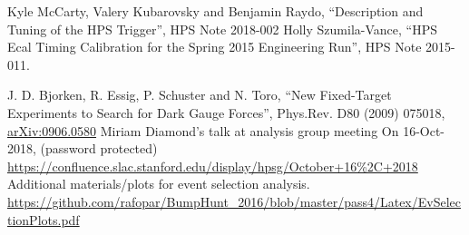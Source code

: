 \documentclass[letterpaper,12pt]{article}
\begin{document}
\clearpage
\begin{thebibliography}{55}
  Kyle McCarty, Valery Kubarovsky and Benjamin Raydo, ``Description and Tuning of the HPS Trigger'', HPS Note 2018-002
  Holly Szumila-Vance, ``HPS Ecal Timing Calibration for the
Spring 2015 Engineering Run'', HPS Note 2015-011.

 J. D. Bjorken, R. Essig, P. Schuster and N. Toro,
``New Fixed-Target Experiments to Search for Dark Gauge Forces'', Phys.Rev. D80 (2009) 075018, \href{https://arxiv.org/abs/0906.0580}{arXiv:0906.0580}
 Miriam Diamond's talk at analysis group meeting On 16-Oct-2018, (password protected) \href{https://confluence.slac.stanford.edu/display/hpsg/October+16%2C+2018}{https://confluence.slac.stanford.edu/display/hpsg/October+16\%2C+2018}
 Additional materials/plots for event selection analysis.\\
\href{https://github.com/rafopar/BumpHunt_2016/blob/master/pass4/Latex/EvSelectionPlots.pdf}{https://github.com/rafopar/BumpHunt\_2016/blob/master/pass4/Latex/EvSelectionPlots.pdf}
\end{thebibliography}
\end{document}
